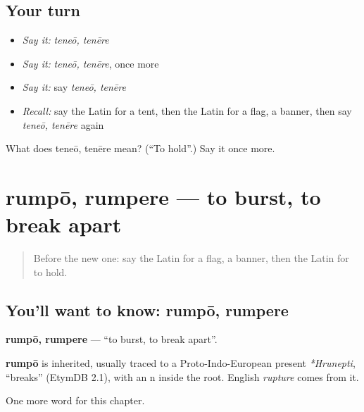 \subsection*{Your turn}
\begin{itemize}
\raggedright
  \item \emph{Say it:} \emph{teneō, tenēre}
  \item \emph{Say it:} \emph{teneō, tenēre}, once more
  \item \emph{Say it:} say \emph{teneō, tenēre}
  \item \emph{Recall:} say the Latin for a tent, then the Latin for a flag, a banner, then say \emph{teneō, tenēre} again
\end{itemize}

\begin{tcolorbox}[breakable,colback=teal!4,colframe=teal!35!black,title={Before you move on}]
What does teneō, tenēre mean? (\textquotedblleft{}To hold\textquotedblright{}.) Say it once more.
\end{tcolorbox}
\section[rumpō, rumpere]{rumpō, rumpere — to burst, to break apart}

\label{lesson:LA-C255-rumpo}



\begin{quote}
Before the new one: say the Latin for a flag, a banner, then the Latin for to hold.
\end{quote}

\subsection*{You'll want to know: rumpō, rumpere}
\textbf{rumpō, rumpere} — \textquotedblleft{}to burst, to break apart\textquotedblright{}.

\begin{cousinweb}
\textbf{rumpō} is inherited, usually traced to a Proto-Indo-European present \emph{*Hrunepti}, \textquotedblleft{}breaks\textquotedblright{} (EtymDB 2.1), with an n inside the root. English \emph{rupture} comes from it.
\end{cousinweb}

\begin{grammarlens}[title={What you've built}]
One more word for this chapter.
\end{grammarlens}

